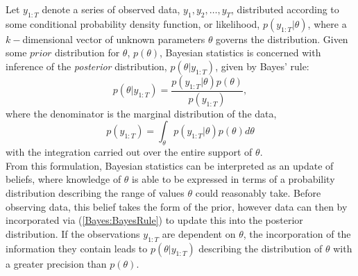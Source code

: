 \documentclass[
12pt, %
onehalfspacing, %
nohyperref, %
headsepline, %
chapterinoneline, %
]{MastersDoctoralThesis} %
\begin{document}
Let $y_{1:T}$ denote a series of observed data, $y_1, y_2, \ldots, y_T$, distributed according to some conditional probability density function, or likelihood, $p(y_{1:T} | \theta)$, where a $k-$dimensional vector of unknown parameters $\theta$ governs the distribution. Given some $\textit{prior}$ distribution for $\theta$, $p(\theta)$, Bayesian statistics is concerned with inference of the \textit{posterior} distribution, $p(\theta | y_{1:T})$, given by Bayes' rule:
\begin{equation}
\label{Bayes:BayesRule}
p(\theta | y_{1:T}) = \frac{p(y_{1:T} | \theta)p(\theta)}{p(y_{1:T})},
\end{equation}
where the denominator is the marginal distribution of the data, 
\begin{equation}
\label{Bayes:Denominator}
p(y_{1:T}) = \int_{\theta} p(y_{1:T} | \theta)p(\theta) d\theta
\end{equation}
with the integration carried out over the entire support of $\theta$.
\\

From this formulation, Bayesian statistics can be interpreted as an update of beliefs, where knowledge of $\theta$ is able to be expressed in terms of a probability distribution describing the range of values $\theta$ could reasonably take. Before observing data, this belief takes the form of the prior, however data can then by incorporated via (\ref{Bayes:BayesRule}) to update this into the posterior distribution. If the observations $y_{1:T}$ are dependent on $\theta$, the incorporation of the information they contain leads to $p(\theta | y_{1:T})$ describing the distribution of $\theta$ with a greater precision than $p(\theta)$.
\\

\iffalse
Let $y_{T+h}$ for some $h \geq 1$ be unobserved, but described by the conditional distribution $p(y_{T+h} | y_{1:T}, \theta)$. Bayesian statistics allows for the uncertainty in $p(\theta | y_{1:T})$ to be included in the prediction distribution $p(y_{T+h} | y_{1:T})$ by the marginalising of $\theta$,
\begin{equation}
\label{Bayes:Predictive}
p(y_{T+h} | y_{1:T}) = \int_{\theta} p(y_{T+h} | y_{1:T}, \theta)p(\theta | y_{1:T}) d\theta.
\end{equation}
\fi
\end{document}
